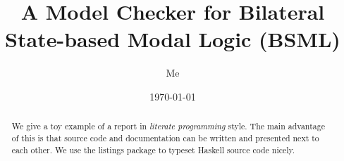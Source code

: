 \documentclass[12pt,a4paper]{article}
\title{A Model Checker for Bilateral State-based Modal Logic (BSML)}
\author{Me}
\date{\today}
\begin{document}
\maketitle

\begin{abstract}
We give a toy example of a report in \emph{literate programming} style.
The main advantage of this is that source code and documentation can
be written and presented next to each other.
We use the listings package to typeset Haskell source code nicely.
\end{abstract}

\vfill

\tableofcontents

\clearpage














\end{document}
